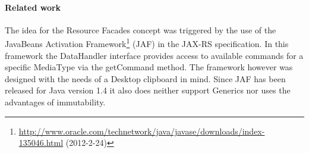 \documentclass[12pt,a4paper]{scrartcl}		%
\newcommand{\citeurl}[2]{\url{#1} (#2)}
\begin{document}




\paragraph{Related work}
\label{sec:resourcefacadesrelated-work}

The idea for the Resource Facades concept was triggered by the use of the
JavaBeans Activation
Framework\footnote{\citeurl{http://www.oracle.com/technetwork/java/javase/downloads/index-135046.html}{2012-2-24}}
(JAF) in the JAX-RS specification. In this framework the DataHandler interface
provides access to available commands for a specific MediaType via the
getCommand method. The framework however was designed with the needs of a
Desktop clipboard in mind. Since JAF has been released for Java version 1.4 it
also does neither support Generics nor uses the advantages of immutability.
\end{document}
